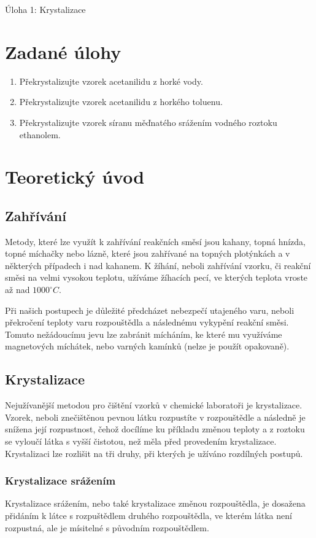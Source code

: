 \documentclass[13pt, a4paper, twoside]{article}
\begin{document}
    \begin{center}
        \Huge
        Úloha 1: Krystalizace
    \end{center}
    \large
\onehalfspacing
    \section*{Zadané úlohy}
    \begin{enumerate}
        \item Překrystalizujte vzorek acetanilidu z horké vody.
        \item Překrystalizujte vzorek acetanilidu z horkého toluenu.
        \item Překrystalizujte vzorek síranu měďnatého srážením vodného roztoku ethanolem.
    \end{enumerate}
    \section*{Teoretický úvod}
    \subsection*{Zahřívání}
    Metody, které lze využít k zahřívání reakčních směsí jsou kahany, topná hnízda,
    topné míchačky nebo lázně, které jsou zahřívané na topných plotýnkách a v některých případech
    i nad kahanem. K žíhání, neboli zahřívání vzorku, či reakční směsi na velmi vysokou
    teplotu, užíváme žíhacích pecí, ve kterých teplota vroste až nad $1000^{\circ}C$.

    Při našich postupech je důležité předcházet nebezpečí utajeného varu, neboli překročení
    teploty varu rozpouštědla a následnému vykypění reakční směsi. Tomuto nežádoucímu jevu
    lze zabránit mícháním, ke které mu využíváme magnetových míchátek, nebo varných kamínků (nelze je použít opakovaně).
    \subsection*{Krystalizace}
    Nejužívanější metodou pro čištění vzorků v chemické laboratoři je krystalizace.
    Vzorek, neboli znečištěnou pevnou látku rozpustíte v rozpouštědle a následně je snížena
    její rozpustnost, čehož docílíme ku příkladu změnou teploty a z roztoku se vyloučí látka s
    vyšší čistotou, než měla před provedením krystalizace. Krystalizaci lze rozlišit na tři
    druhy, při kterých je užíváno rozdílných postupů.
    \subsubsection*{Krystalizace srážením}
    Krystalizace srážením, nebo také krystalizace změnou rozpouštědla, je dosažena přidáním
    k látce s rozpuštědlem druhého rozpouštědla, ve kterém látka není rozpustná, ale je mísitelné
    s původním rozpouštědlem.
\end{document}
